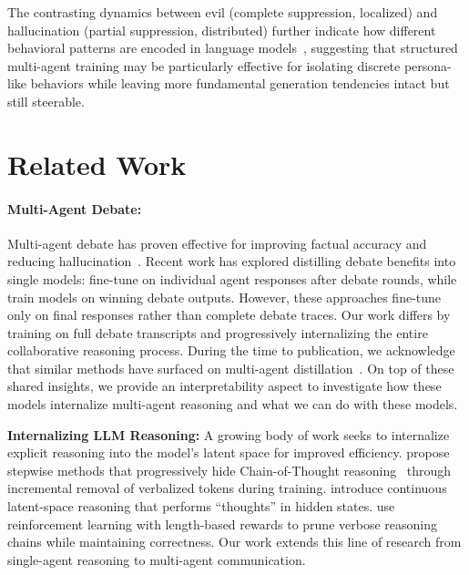 \documentclass[11pt]{article}
\begin{document}
The contrasting dynamics between evil (complete suppression, localized) and hallucination (partial suppression, distributed) further indicate how different behavioral patterns are encoded in language models~\cite{arditi2024refusal, orgad2024llms}, suggesting that structured multi-agent training may be particularly effective for isolating discrete persona-like behaviors while leaving more fundamental generation tendencies intact but still steerable.

\section{Related Work}
\paragraph{Multi-Agent Debate:} Multi-agent debate has proven effective for improving factual accuracy and reducing hallucination~\cite{Du2023Improving, Liang2024Encouraging}. Recent work has explored distilling debate benefits into single models: \citet{srivastava2025debate} fine-tune on individual agent responses after debate rounds, while \citet{subramaniam2024debategpt, subramaniam2025multiagent} train models on winning debate outputs. However, these approaches fine-tune only on final responses rather than complete debate traces. Our work differs by training on full debate transcripts and progressively internalizing the entire collaborative reasoning process.
During the time to publication, we acknowledge that similar methods have surfaced on multi-agent distillation~\cite{li2025chain, luo2026agentark}. On top of these shared insights, we provide an interpretability aspect to investigate how these models internalize multi-agent reasoning and what we can do with these models.

\textbf{Internalizing LLM Reasoning:} A growing body of work seeks to internalize explicit reasoning into the model's latent space for improved efficiency. \citet{deng2023implicit, deng2024explicit} propose stepwise methods that progressively hide Chain-of-Thought reasoning~\cite{Wei2022Chain}  through incremental removal of verbalized tokens during training. \citet{hao2024training} introduce continuous latent-space reasoning that performs ``thoughts'' in hidden states. \citet{hou2025thinkprune} use reinforcement learning with length-based rewards to prune verbose reasoning chains while maintaining correctness. Our work extends this line of research from single-agent reasoning to multi-agent communication.
\end{document}
